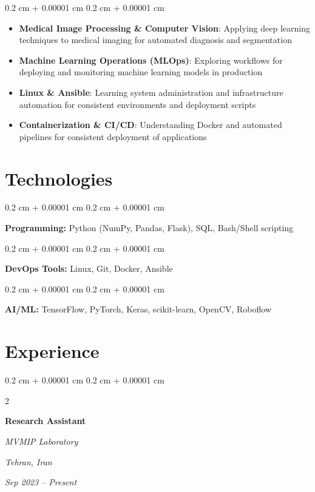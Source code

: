 \documentclass[10pt, letterpaper]{article}
\newenvironment{highlights}{
    \begin{itemize}[
        topsep=0.10 cm,
        parsep=0.10 cm,
        partopsep=0pt,
        itemsep=0pt,
        leftmargin=0.4 cm + 10pt
    ]
}{
    \end{itemize}
} %
\newenvironment{onecolentry}{
    \begin{adjustwidth}{
        0.2 cm + 0.00001 cm
    }{
        0.2 cm + 0.00001 cm
    }
}{
    \end{adjustwidth}
} %
\newenvironment{twocolentry}[2][]{
    \onecolentry
    \def\secondColumn{#2}
    \setcolumnwidth{\fill, 5.5 cm}
    \begin{paracol}{2}
}{
    \switchcolumn \raggedleft \secondColumn
    \end{paracol}
    \endonecolentry
} %
\begin{document}
		\vspace{0.10 cm}
		\begin{onecolentry}
			\begin{highlights}
				\item \textbf{Medical Image Processing \& Computer Vision}: Applying deep learning techniques to medical imaging for automated diagnosis and segmentation
				\item \textbf{Machine Learning Operations (MLOps)}: Exploring workflows for deploying and monitoring machine learning models in production
				\item \textbf{Linux \& Ansible}: Learning system administration and infrastructure automation for consistent environments and deployment scripts
				\item \textbf{Containerization \& CI/CD}: Understanding Docker and automated pipelines for consistent deployment of applications
			\end{highlights}
		\end{onecolentry} 


	  \section{Technologies}
	
	
	
	
		\begin{onecolentry}
			\textbf{Programming:} Python (NumPy, Pandas, Flask), SQL, Bash/Shell scripting
		\end{onecolentry}
		
		\vspace{0.2 cm}
		
		\begin{onecolentry}
			\textbf{DevOps Tools:} Linux, Git, Docker, Ansible
		\end{onecolentry}
		
		\vspace{0.2 cm}
		
		\begin{onecolentry}
			\textbf{AI/ML:} TensorFlow, PyTorch, Keras, scikit-learn, OpenCV, Roboflow
		\end{onecolentry}
    
    \section{Experience}
    
    \begin{twocolentry}{
    		\textit{Tehran, Iran}    
    		
    		\textit{Sep 2023 – Present}}
    	\textbf{Research Assistant}
    	
    	\textit{MVMIP Laboratory}
    \end{twocolentry}
    
\end{document}

